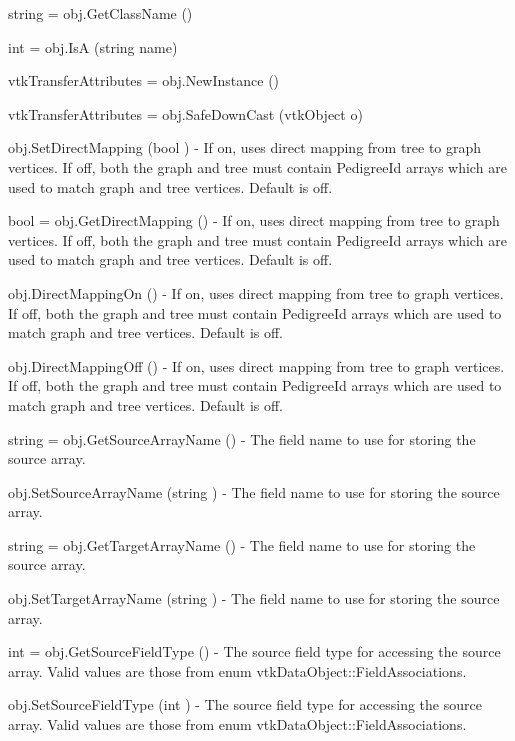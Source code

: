 \begin{DoxyItemize}
\item {\ttfamily string = obj.\-Get\-Class\-Name ()}  
\item {\ttfamily int = obj.\-Is\-A (string name)}  
\item {\ttfamily vtk\-Transfer\-Attributes = obj.\-New\-Instance ()}  
\item {\ttfamily vtk\-Transfer\-Attributes = obj.\-Safe\-Down\-Cast (vtk\-Object o)}  
\item {\ttfamily obj.\-Set\-Direct\-Mapping (bool )} -\/ If on, uses direct mapping from tree to graph vertices. If off, both the graph and tree must contain Pedigree\-Id arrays which are used to match graph and tree vertices. Default is off.  
\item {\ttfamily bool = obj.\-Get\-Direct\-Mapping ()} -\/ If on, uses direct mapping from tree to graph vertices. If off, both the graph and tree must contain Pedigree\-Id arrays which are used to match graph and tree vertices. Default is off.  
\item {\ttfamily obj.\-Direct\-Mapping\-On ()} -\/ If on, uses direct mapping from tree to graph vertices. If off, both the graph and tree must contain Pedigree\-Id arrays which are used to match graph and tree vertices. Default is off.  
\item {\ttfamily obj.\-Direct\-Mapping\-Off ()} -\/ If on, uses direct mapping from tree to graph vertices. If off, both the graph and tree must contain Pedigree\-Id arrays which are used to match graph and tree vertices. Default is off.  
\item {\ttfamily string = obj.\-Get\-Source\-Array\-Name ()} -\/ The field name to use for storing the source array.  
\item {\ttfamily obj.\-Set\-Source\-Array\-Name (string )} -\/ The field name to use for storing the source array.  
\item {\ttfamily string = obj.\-Get\-Target\-Array\-Name ()} -\/ The field name to use for storing the source array.  
\item {\ttfamily obj.\-Set\-Target\-Array\-Name (string )} -\/ The field name to use for storing the source array.  
\item {\ttfamily int = obj.\-Get\-Source\-Field\-Type ()} -\/ The source field type for accessing the source array. Valid values are those from enum vtk\-Data\-Object\-::\-Field\-Associations.  
\item {\ttfamily obj.\-Set\-Source\-Field\-Type (int )} -\/ The source field type for accessing the source array. Valid values are those from enum vtk\-Data\-Object\-::\-Field\-Associations.  

\end{DoxyItemize}
